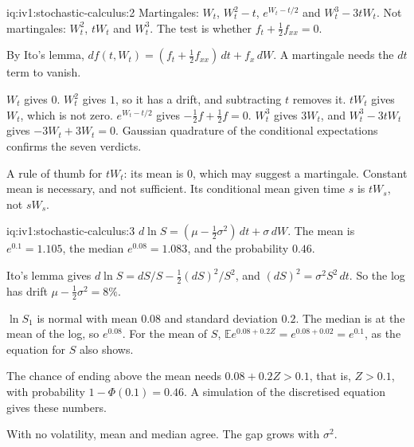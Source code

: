 \begin{solution}{iq:iv1:stochastic-calculus:2}
Martingales: $W_t$, $W_t^2 - t$, $e^{W_t - t/2}$ and $W_t^3 - 3tW_t$. Not martingales: $W_t^2$, $tW_t$ and $W_t^3$. The test is whether $f_t + \frac12f_{xx} = 0$.

By Ito's lemma, $df(t, W_t) = (f_t + \frac12f_{xx})\,dt + f_x\,dW$. A martingale needs the $dt$ term to vanish.

$W_t$ gives $0$. $W_t^2$ gives $1$, so it has a drift, and subtracting $t$ removes it. $tW_t$ gives $W_t$, which is not zero. $e^{W_t - t/2}$ gives $-\frac12 f + \frac12f = 0$. $W_t^3$ gives $3W_t$, and $W_t^3 - 3tW_t$ gives $-3W_t + 3W_t = 0$. Gaussian quadrature of the conditional expectations confirms the seven verdicts.

A rule of thumb for $tW_t$: its mean is 0, which may suggest a martingale. Constant mean is necessary, and not sufficient. Its conditional mean given time $s$ is $tW_s$, not $sW_s$.



\end{solution}

\begin{solution}{iq:iv1:stochastic-calculus:3}
$d\ln S = (\mu - \frac12\sigma^2)\,dt + \sigma\,dW$. The mean is $e^{0.1} = 1.105$, the median $e^{0.08} = 1.083$, and the probability $0.46$.

Ito's lemma gives $d\ln S = dS/S - \frac12(dS)^2/S^2$, and $(dS)^2 = \sigma^2S^2\,dt$. So the log has drift $\mu - \frac12\sigma^2 = 8\%$.

$\ln S_1$ is normal with mean $0.08$ and standard deviation $0.2$. The median is at the mean of the log, so $e^{0.08}$. For the mean of $S$, $\mathbb{E}e^{0.08 + 0.2Z} = e^{0.08 + 0.02} = e^{0.1}$, as the equation for $S$ also shows.

The chance of ending above the mean needs $0.08 + 0.2Z > 0.1$, that is, $Z > 0.1$, with probability $1 - \Phi(0.1) = 0.46$. A simulation of the discretised equation gives these numbers.

With no volatility, mean and median agree. The gap grows with $\sigma^2$.



\end{solution}

